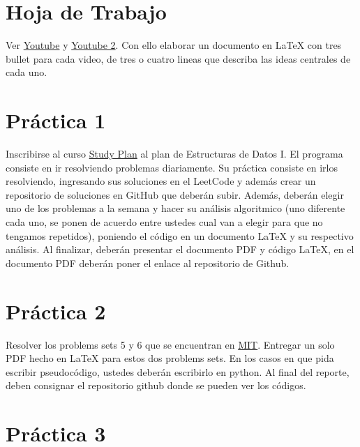 \section{Hoja de Trabajo}
Ver \href{https://www.youtube.com/watch?v=pVfj6mxhdMw}{Youtube} y \href{https://www.youtube.com/watch?v=obWXjtg0L64}{Youtube 2}. Con ello elaborar un documento en LaTeX con tres bullet para cada video, de tres o cuatro lineas que describa las ideas centrales de cada uno.




\section{Práctica 1}
Inscribirse al curso \href{https://leetcode.com/study-plan/}{Study Plan} al plan de Estructuras de Datos I. El programa consiste en ir resolviendo problemas diariamente. Su práctica consiste en irlos resolviendo, ingresando sus soluciones en el LeetCode y además crear un repositorio de soluciones en GitHub que deberán subir. Además, deberán elegir uno de los problemas a la semana y hacer su análisis algoritmico (uno diferente cada uno, se ponen de acuerdo entre ustedes cual van a elegir para que no tengamos repetidos), poniendo el código en un documento LaTeX y su respectivo análisis. Al finalizar, deberán presentar el documento PDF y código LaTeX, en el documento PDF deberán poner el enlace al repositorio de Github.




\section{Práctica 2}

Resolver los problems sets 5 y 6 que se encuentran en \href{https://ocw.mit.edu/courses/electrical-engineering-and-computer-science/6-006-introduction-to-algorithms-fall-2011/assignments/}{MIT}. Entregar un solo PDF hecho en  LaTeX para estos dos problems sets. En los casos en que pida escribir pseudocódigo, ustedes deberán escribirlo en python. Al final del reporte, deben consignar el repositorio github donde se pueden ver los códigos.




\section{Práctica 3}

